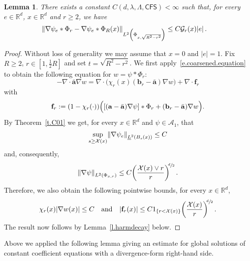 \documentclass[11pt]{article} %
\numberwithin{equation}{section}
\newtheorem{lemma}[theorem]{Lemma}
\theoremstyle{definition}
\let\originalleft\left
\let\originalright\right
\renewcommand{\left}{\mathopen{}\mathclose\bgroup\originalleft}
\renewcommand{\right}{\aftergroup\egroup\originalright}
\newcommand*{\R}{\ensuremath{\mathbb{R}}}
\renewcommand{\b}{\ensuremath{\mathbf{b}}}
\newcommand{\qand}{\quad \mbox{and} \quad }
\newcommand{\f}{\mathbf{f}}
\renewcommand{\a}{\mathbf{a}}
\newcommand{\ahom}{\bar{\a}}
\newcommand{\X}{\mathcal{X}}
\newcommand{\indc}{1}
\newcommand{\minscale}{\chi}
\newcommand{\CFS}{\mathsf{CFS}}
\newcommand{\A}{\mathcal{A}}
\begin{document}
\begin{lemma}
\label{l.scalecomparison}
There exists a constant $C(d,\lambda,\Lambda,\CFS)<\infty$ such that, for every $e \in \R^d$, $x\in \R^d$ and $r \geq 2$,  we have
\begin{align}
\label{e.scalecomparison}
\left\| \nabla \psi_e \ast \Phi_r  - \nabla \psi_e \ast \Phi_R(x)\right\|_{L^2 \left( \Phi_{x,\sqrt{R^2 - r^2}} \right)} 
& \leq 
C \mathcal{G}_r(x) |e|
\,.
\end{align}
\end{lemma}
\begin{proof}
Without loss of generality we may assume that $x=0$ and $|e|=1$.  Fix $R \geq 2$, $r \in [1,\frac12 R]$  and set $t = \sqrt{R^2-r^2}$. We first apply~\eqref{e.coarsened.equation} to obtain the following equation for $w = \psi \ast \Phi_r$:
\begin{equation*}  
-\nabla \cdot \ahom \nabla w = 
\nabla \cdot \bigl( \minscale_r(x)  (\b_r - \ahom) \nabla w \bigr) + \nabla \cdot \f_{r} 
\end{equation*}
with
\begin{equation*}  
\f_{r} := (1-\minscale_r(\cdot) ) \Bigl( [(\a - \ahom) \nabla \psi] \ast \Phi_{r} + (\b_r - \ahom) \nabla w\Bigr) 
.
\end{equation*}
By Theorem~\ref{t.C01} we get, for every $x\in\R^d$ and $\psi \in \A_1$, that
\begin{equation} \label{e.corr.grad.bound.pre}
\sup_{s \geq \X(x)}\left\| \nabla \psi_e \right\|_{\underline{L}^2 \left( B_{s}(x) \right)} 
\leq 
C
\end{equation}
and, consequently,
\begin{equation}  \label{e.corr.grad.bound}
\left\| \nabla \psi \right\|_{L^2(\Phi_{x,r})} 
\leq 
C  \biggl( \frac{\X(x) \vee r}{r} \biggr)^{\!\!\sfrac d2} 
\,.
\end{equation}
Therefore, we also obtain the following pointwise bounds, for every $x\in\R^d$, 
\begin{equation*}  
\minscale_r(x) | \nabla w(x)| \leq C \qand |\f_{r}(x)| \leq C  \indc_{\{r< \X(x)\}}  \biggl( \frac{\X (x)}{r} \biggr)^{\!\!\sfrac d2} 
\,.
\end{equation*}
The result now follows by Lemma~\ref{l.harmdecay} below. 
\end{proof}

Above we applied the following lemma giving an estimate for global solutions of constant coefficient equations with a divergence-form right-hand side. 
\end{document}
